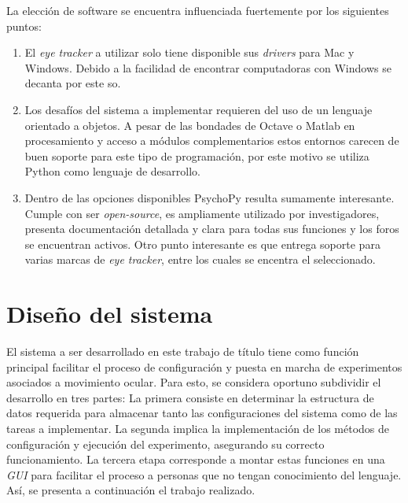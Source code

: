 \documentclass[\main/main.tex]{subfiles}
\begin{document}
		\newpage
		La elección de software se encuentra influenciada fuertemente por los siguientes puntos:
		\begin{enumerate}\setlength\itemsep{-0.5em}
			\item El \textit{eye tracker} a utilizar solo tiene disponible sus \textit{drivers} para Mac y Windows. Debido a la facilidad de encontrar computadoras con Windows se decanta por este \acrshort{so}.

			\item Los desafíos del sistema a implementar requieren del uso de un lenguaje orientado a objetos. A pesar de las bondades de Octave o Matlab en procesamiento y acceso a módulos complementarios estos entornos carecen de buen soporte para este tipo de programación, por este motivo se utiliza Python como lenguaje de desarrollo. 

			\item Dentro de las opciones disponibles PsychoPy resulta sumamente interesante. Cumple con ser \textit{open-source}, es ampliamente utilizado por investigadores, presenta documentación detallada y clara para todas sus funciones y los foros se encuentran activos. Otro punto interesante es que entrega soporte para varias marcas de \textit{eye tracker}, entre los cuales se encentra el seleccionado.

		\end{enumerate}

	\section{Diseño del sistema}
	\label{sec:03_diseño_sistema}
		El sistema a ser desarrollado en este trabajo de título tiene como función principal facilitar el proceso de configuración y puesta en marcha de experimentos asociados a movimiento ocular. Para esto, se considera oportuno subdividir el desarrollo en tres partes: La primera consiste en determinar la estructura de datos requerida para almacenar tanto las configuraciones del sistema como de las tareas a implementar. La segunda implica la implementación de los métodos de configuración y ejecución del experimento, asegurando su correcto funcionamiento. La tercera etapa corresponde a montar estas funciones en una \textit{GUI} para facilitar el proceso a personas que no tengan conocimiento del lenguaje. Así, se presenta a continuación el trabajo realizado.
\end{document}
